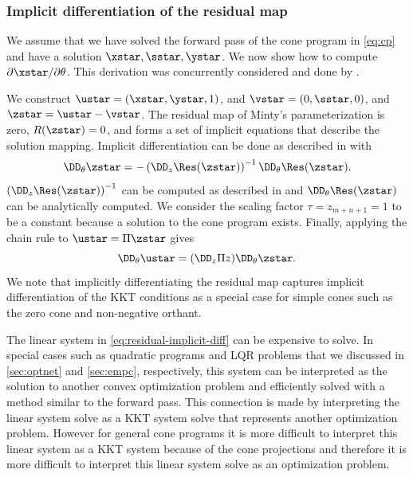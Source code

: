 \subsubsection{Implicit differentiation of the residual map}
We assume that we have solved the forward pass of the
cone program in \cref{eq:cp} and have a solution
$\xstar, \sstar, \ystar$.
We now show how to compute
$\partial \xstar/\partial \theta$.
This derivation was concurrently considered and done by
\citet{agrawal2019differentiating}.

We construct $\ustar=(\xstar, \ystar, 1)$,
and $\vstar=(0,\sstar, 0)$, and $\zstar=\ustar-\vstar$.
The residual map of Minty's parameterization is zero,
$R(\zstar)=0$, and forms a set of
implicit equations that describe the solution mapping.
Implicit differentiation can be done as described in
\citet{dontchev2009implicit} with
\begin{equation}
  \label{eq:residual-implicit-diff}
  \DD_\theta \zstar =
    -\left(\DD_z \Res(\zstar)\right)^{-1}
    \DD_\theta \Res(\zstar).
\end{equation}
$\left(\DD_z \Res(\zstar)\right)^{-1}$ can be computed
as described in \citep{busseti2018solution}
and $\DD_\theta \Res(\zstar)$ can be analytically computed.
We consider the scaling factor $\tau=z_{m+n+1}=1$ to be
a constant because a solution to the cone program exists.
Finally, applying the chain rule to $\ustar=\Pi \zstar$
gives
\begin{equation}
  \DD_\theta \ustar = (\DD_z \Pi z) \DD_\theta \zstar.
\end{equation}
We note that implicitly differentiating the residual
map captures implicit differentiation of the KKT conditions
as a special case for simple cones such as the zero cone
and non-negative orthant.

The linear system in \cref{eq:residual-implicit-diff}
can be expensive to solve.
In special cases such as quadratic programs and LQR problems
that we discussed in \cref{sec:optnet} and
\cref{sec:empc}, respectively, this system can be interpreted
as the solution to another convex optimization problem
and efficiently solved with a method similar to the
forward pass.
This connection is made by interpreting the linear system
solve as a KKT system solve that represents another
optimization problem.
However for general cone programs it is more difficult
to interpret this linear system as a KKT system
because of the cone projections and therefore it
is more difficult to interpret this linear system
solve as an optimization problem.

